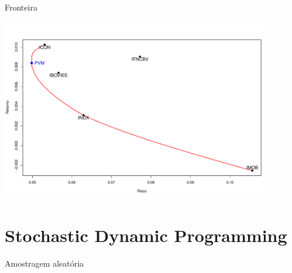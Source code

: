 \documentclass{beamer}
\begin{document}
\begin{frame}{Fronteira}

\begin{center}
 \includegraphics[height=8cm,keepaspectratio]{fronteira_ativos.pdf}
 \end{center}


\end{frame}


%
%
%
%
%
%


\section{Stochastic Dynamic Programming}

\begin{frame}{ }
    \begin{block}{ }
      \Huge  Amostragem aleatória
    \end{block}
\end{frame}
\end{document}
